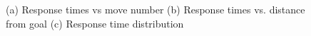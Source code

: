 \documentclass[10pt,letterpaper]{article}
\begin{document}
\begin{figure}
	\centering
	\caption{(a) Response times vs move number (b) Response times vs. distance from goal (c) Response time distribution}
	\label{fig:p3}
\end{figure}
\end{document}
